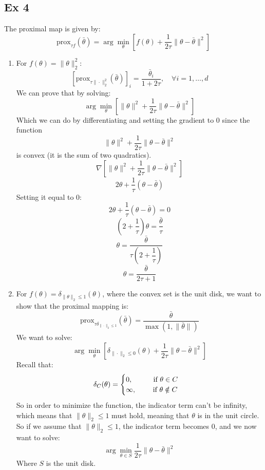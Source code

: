 \documentclass[12pt]{article}
\begin{document}
\subsection*{Ex 4}
The proximal map is given by:
\[ \text{prox}_{\tau f}(\bar{\theta})
= \arg\min_{\theta} \left[ f(\theta) 
+ \frac{1}{2\tau} \|\theta - \bar{\theta}\|^2 \right] \]
\begin{enumerate}[label = \letters]
    \item For $f(\theta) = \|\theta\|^2_2$:
    \[ \left[ \text{prox}_{\tau \|\cdot\|_2^2}
    (\bar{\theta}) \right]_i = 
    \frac{\bar{\theta}_i}{1 + 2\tau}, 
    \quad \forall i = 1, \ldots, d \]
    We can prove that by solving:
    \[ \arg\min_{\theta} \left[ \|\theta\|^2 + 
    \frac{1}{2\tau} \|\theta - \bar{\theta}\|^2 \right] \]
    Which we can do by differentiating and setting
    the gradient to $0$ since the function
    \[ \|\theta\|^2 + 
    \frac{1}{2\tau} \|\theta - \bar{\theta}\|^2 \]
    is convex (it is the sum of two quadratics).
    \[ \nabla \left[ \|\theta\|^2 + 
    \frac{1}{2\tau} \|\theta - \bar{\theta}\|^2 \right] \]
    \[ 2\theta + 
    \frac{1}{\tau}(\theta - \bar{\theta}) \]
    Setting it equal to $0$:
    \[ 2\theta + \frac{1}{\tau}(\theta - \bar{\theta})
    = 0 \]
    \[ (2 + \dfrac{1}{\tau})\theta
    = \frac{\bar{\theta}}{\tau} \]
    \[ \theta = \frac{\bar{\theta}}
    {\tau(2 + \dfrac{1}{\tau})} \]
    \[ \theta = \frac{\bar{\theta}}{2\tau + 1} \]
\item For $f(\theta) = 
    \delta_{\|\theta \|_2 \leq 1}(\theta)$,
    where the convex set is the unit disk,
    we want to show that the proximal mapping is:
    \[ \text{prox}_{\tau \delta_{\|\cdot\|_2 \leq 1}}
    (\bar{\theta}) = \frac{\bar{\theta}}
    {\max(1, \|\bar{\theta}\|)}\] 
    We want to solve:
    \[ \arg\min_{\theta} \left[ 
    \delta_{\|\cdot\|_2 \leq 0} (\theta) + 
    \frac{1}{2\tau} \|\theta - \bar{\theta}\|^2 \right] \]
    Recall that:
    \[ \delta_C(\theta)
    = \begin{cases} 0, \qquad \;\; \text{ if }  \theta \in C \\
    \infty, \qquad \text{ if } \theta \notin C  \end{cases} \]
    So in order to minimize the function,
    the indicator term can't be infinity,
    which means that $\|\theta\|_2 \leq 1$ must hold,
    meaning that $\theta$ is in the unit circle. \\
    So if we assume that $\|\theta\|_2 \leq 1$,
    the indicator term becomes $0$,
    and we now want to solve:
    \[ \arg\min_{\theta \in S} 
    \frac{1}{2\tau} \|\theta - \bar{\theta}\|^2\]
    Where $S$ is the unit disk. \\

\end{enumerate}
\end{document}
